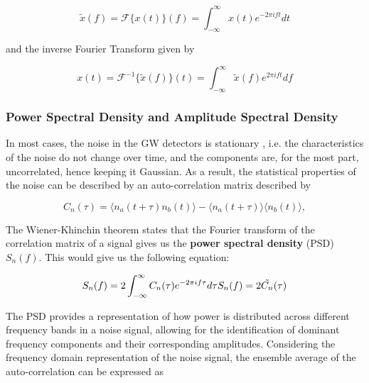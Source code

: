 \documentclass[12pt]{article}
\begin{document}
\begin{equation}
    \tilde{x}(f) = \mathcal{F}\{ x(t) \} (f) = \int_{-\infty}^{\infty} x(t) e^{-2 \pi i f t} dt
    \label{eq:fourier_transform}
\end{equation}

\noindent and the inverse Fourier Transform given by

\begin{equation}
  x(t) = \mathcal{F}^{-1} \{ \tilde{x}(f) \} (t) = \int_{-\infty}^{\infty} \tilde{x}(f) e^{2 \pi i f t} df
  \label{eq:inverse_fourier_transform}
\end{equation}

\subsubsection{Power Spectral Density and Amplitude Spectral Density}

\noindent In most cases, the noise in the GW detectors is stationary \cite{collaboration_characterization_2016}, i.e. the characteristics of the noise do not change over time, and the components are, for the most part, uncorrelated, hence keeping it Gaussian. As a result, the statistical properties of the noise can be described by an auto-correlation matrix described by

\begin{equation}
    C_n(\tau) = \langle n_a(t+\tau) n_b(t) \rangle - \langle n_a(t+\tau) \rangle \langle n_b(t) \rangle,
    \label{eq:autocorrelation}
\end{equation}

\medskip
\noindent The Wiener-Khinchin theorem \cite{chatfield1989analysis} states that the Fourier transform of the correlation matrix of a signal gives us the \textbf{power spectral density} (PSD) $S_n(f)$. This would give us the following equation:

\begin{equation}
  S_n(f) = 2 \int_{-\infty}^{\infty} C_n(\tau) e^{-2 \pi i f \tau} d\tau \\
  S_n(f) = 2 \tilde{C_n}(\tau) \\
  \label{eq:psd_autocorrelation}
\end{equation}

\noindent The PSD provides a representation of how power is distributed across different frequency bands in a noise signal\cite{Oppenheim_2009, Li:2013lza}, allowing for the identification of dominant frequency components and their corresponding amplitudes. Considering the frequency domain representation of the noise signal, the ensemble average of the auto-correlation can be expressed as
\end{document}
